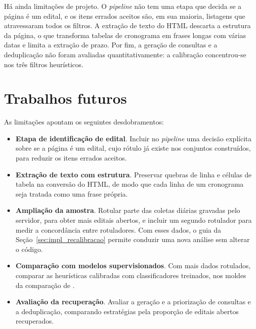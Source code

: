 Há ainda limitações de projeto. O \textit{pipeline} não tem uma etapa que
decida se a página é um edital, e os itens errados aceitos são, em sua maioria,
listagens que atravessaram todos os filtros. A extração de texto do HTML
descarta a estrutura da página, o que transforma tabelas de cronograma em
frases longas com várias datas e limita a extração de prazo. Por fim, a
geração de consultas e a deduplicação não foram avaliadas quantitativamente:
a calibração concentrou-se nos três filtros heurísticos.

\section{Trabalhos futuros}
\label{sec:futuros}

As limitações apontam os seguintes desdobramentos:

\begin{itemize}
  \item \textbf{Etapa de identificação de edital}. Incluir no
    \textit{pipeline} uma decisão explícita sobre se a página é um edital,
    cujo rótulo já existe nos conjuntos construídos, para reduzir os itens
    errados aceitos.
  \item \textbf{Extração de texto com estrutura}. Preservar quebras de linha e
    células de tabela na conversão do HTML, de modo que cada linha de um
    cronograma seja tratada como uma frase própria.
  \item \textbf{Ampliação da amostra}. Rotular parte das coletas diárias
    gravadas pelo servidor, para obter mais editais abertos, e incluir um
    segundo rotulador para medir a concordância entre rotuladores. Com esses
    dados, o guia da Seção~\ref{sec:impl_recalibracao} permite conduzir uma
    nova análise sem alterar o código.
  \item \textbf{Comparação com modelos supervisionados}. Com mais dados
    rotulados, comparar as heurísticas calibradas com classificadores
    treinados, nos moldes da comparação de .
  \item \textbf{Avaliação da recuperação}. Avaliar a geração e a priorização de
    consultas e a deduplicação, comparando estratégias pela proporção de
    editais abertos recuperados.
\end{itemize}
